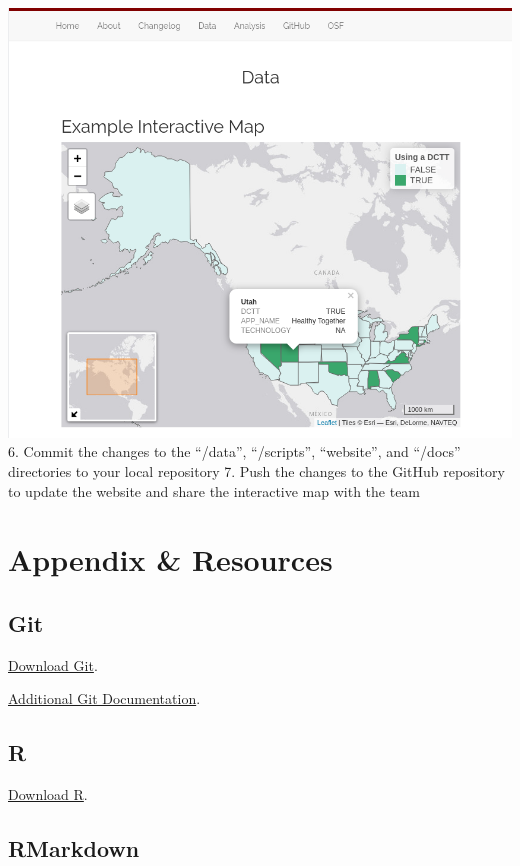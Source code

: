 \documentclass[
]{book}
\begin{document}
\includegraphics{images/04-example2_4.png}
6. Commit the changes to the ``/data'', ``/scripts'', ``website'', and ``/docs'' directories to your local repository
7. Push the changes to the GitHub repository to update the website and share the interactive map with the team

\hypertarget{appendix-resources}{%
\chapter*{Appendix \& Resources}\label{appendix-resources}}

\hypertarget{git}{%
\section*{Git}\label{git}}

\href{https://git-scm.com/downloads}{Download Git}.

\href{https://git-scm.com/doc}{Additional Git Documentation}.

\hypertarget{r}{%
\section*{R}\label{r}}

\href{https://cloud.r-project.org/}{Download R}.

\hypertarget{rmarkdown}{%
\section*{RMarkdown}\label{rmarkdown}}
\end{document}

